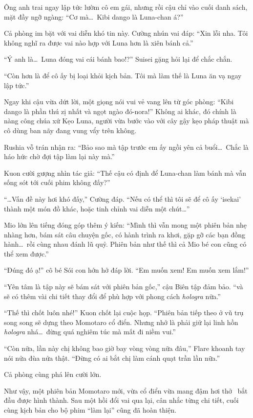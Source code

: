 \documentclass[../main.tex]{subfiles}
\begin{document}
Ông anh trai ngay lập tức lườm cô em gái, nhưng rồi cậu chỉ vào cuối danh sách, mặt đầy ngỡ ngàng: ``Cơ mà\dots\ Kibi dango là Luna-chan á?''

Cả phòng im bặt với vai diễn khó tin này. Cường nhún vai đáp: ``Xin lỗi nha. Tôi không nghĩ ra được vai nào hợp với Luna hơn là xiên bánh cả.''

``Ý anh là\dots\ Luna đóng vai cái bánh bao!?'' Suisei gặng hỏi lại để chắc chắn.

``Còn hơn là để cô ấy bị loại khỏi kịch bản. Tôi mà làm thế là Luna ăn vạ ngay lập tức.''

Ngay khi cậu vừa dứt lời, một giọng nói vui vẻ vang lên từ góc phòng: ``Kibi dango là phần thú zị nhất và ngọt ngào đó-nora!'' Không ai khác, đó chính là nàng công chúa xứ Kẹo Luna, người vừa bước vào với cây gậy kẹo pháp thuật mà cô dùng ban nãy đang vung vẩy trên không.

Rushia vỗ trán nhận ra: ``Bảo sao mà tập trước em ấy ngồi yên cả buổi\dots\ Chắc là háo hức chờ đợi tập làm lại này mà.''

Kuon cười gượng nhìn tác giả: ``Thế cậu có định để Luna-chan làm bánh mà vẫn sống sót tới cuối phim không đấy?''

``\dots Vấn đề này hơi khó đấy,'' Cường đáp. ``Nếu có thể thì tôi sẽ để cô ấy `isekai' thành một món đồ khác, hoặc tinh chỉnh vai diễn một chút\dots''

Mio lớn lên tiếng đóng góp thêm ý kiến: ``Mình thì vẫn mong một phiên bản nhẹ nhàng hơn, bám sát câu chuyện gốc, có hành trình ra khơi, gặp gỡ các bạn đồng hành\dots\ rồi cùng nhau đánh lũ quỷ. Phiên bản như thế thì cả Mio bé con cũng có thể xem được.''

``Đúng đó ạ!'' cô bé Sói con hớn hở đáp lời. ``Em muốn xem! Em muốn xem lắm!''

``Yên tâm là tập này sẽ bám sát với phiên bản gốc,'' cậu Biên tập đảm bảo. ``và sẽ có thêm vài chi tiết thay đổi để phù hợp với phong cách \textit{hologra} nữa.''

``Thế thì chốt luôn nhé!'' Kuon chốt lại cuộc họp. ``Phiên bản tiếp theo ở vũ trụ song song sẽ dựng theo Momotaro cổ điển. Nhưng nhớ là phải giữ lại linh hồn \textit{hologra} nhá\dots\ đừng quá nghiêm túc mà mất đi niềm vui.''

``Còn nữa, lần này chị không bao giờ bay vòng vòng nữa đâu,'' Flare khoanh tay nói nửa đùa nửa thật. ``Đừng có ai bắt chị làm cánh quạt trần lần nữa.''

Cả phòng cùng phá lên cười lớn.

Như vậy, một phiên bản Momotaro mới, vừa cổ điển vừa mang đậm hơi thở \hll\ bắt đầu được hình thành. Sau một hồi đổi vai qua lại, cân nhắc từng chi tiết, cuối cùng kịch bản cho bộ phim ``làm lại'' cũng đã hoàn thiện.
\end{document}
